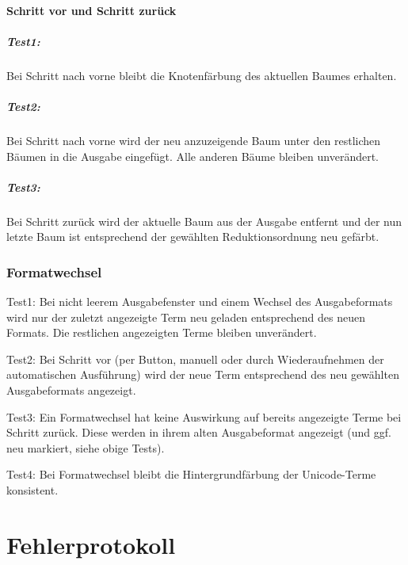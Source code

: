 \documentclass[parskip=full,11pt,openany]{scrreprt}
\begin{document}
\subsubsection{Schritt vor und Schritt zurück}
\paragraph{Test1:} Bei Schritt nach vorne bleibt die Knotenfärbung des aktuellen Baumes erhalten.

\paragraph{Test2:} Bei Schritt nach vorne wird der neu anzuzeigende Baum unter den restlichen Bäumen in die Ausgabe eingefügt. Alle anderen Bäume bleiben unverändert.

\paragraph{Test3:} Bei Schritt zurück wird der aktuelle Baum aus der Ausgabe entfernt und der nun letzte Baum ist entsprechend der gewählten Reduktionsordnung neu gefärbt.

\subsection{Formatwechsel}
Test1: Bei nicht leerem Ausgabefenster und einem Wechsel des Ausgabeformats wird nur der zuletzt angezeigte Term neu geladen entsprechend des neuen Formats. Die restlichen angezeigten Terme bleiben unverändert.

Test2: Bei Schritt vor (per Button, manuell oder durch Wiederaufnehmen der automatischen Ausführung) wird der neue Term entsprechend des neu gewählten Ausgabeformats angezeigt. 

Test3: Ein Formatwechsel hat keine Auswirkung auf bereits angezeigte Terme bei Schritt zurück. Diese werden in ihrem alten Ausgabeformat angezeigt (und ggf. neu markiert, siehe obige Tests).

Test4: Bei Formatwechsel bleibt die Hintergrundfärbung der Unicode-Terme konsistent. %



\chapter{Fehlerprotokoll}
\end{document}
